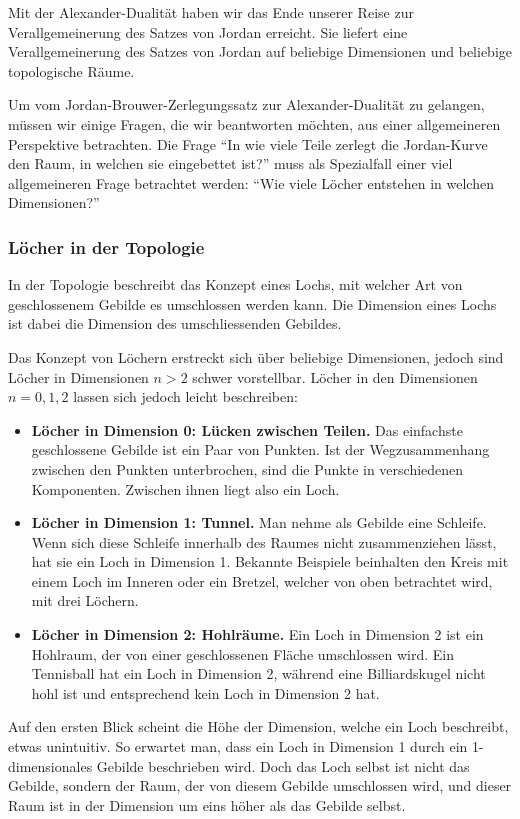 Mit der Alexander-Dualität haben wir das Ende unserer Reise zur Verallgemeinerung des Satzes von Jordan erreicht.
Sie liefert eine Verallgemeinerung des Satzes von Jordan auf beliebige Dimensionen und beliebige topologische Räume.

Um vom Jordan-Brouwer-Zerlegungssatz zur Alexander-Dualität zu gelangen, müssen wir einige Fragen, die wir beantworten möchten, aus einer allgemeineren Perspektive betrachten.
Die Frage ``In wie viele Teile zerlegt die Jordan-Kurve den Raum, in welchen sie eingebettet ist?'' muss als Spezialfall einer viel allgemeineren Frage betrachtet werden: ``Wie viele Löcher entstehen in welchen Dimensionen?''

\subsubsection{Löcher in der Topologie}

In der Topologie beschreibt das Konzept eines Lochs, mit welcher Art von geschlossenem Gebilde es umschlossen werden kann.
Die Dimension eines Lochs ist dabei die Dimension des umschliessenden Gebildes.

Das Konzept von Löchern erstreckt sich über beliebige Dimensionen, jedoch sind Löcher in Dimensionen $n>2$ schwer vorstellbar.
Löcher in den Dimensionen $n=0,1,2$ lassen sich jedoch leicht beschreiben:

\begin{itemize}
    \item \textbf{Löcher in Dimension 0: Lücken zwischen Teilen.} Das einfachste geschlossene Gebilde ist ein Paar von Punkten. Ist der Wegzusammenhang zwischen den Punkten unterbrochen, sind die Punkte in verschiedenen Komponenten. Zwischen ihnen liegt also ein Loch.
    \item \textbf{Löcher in Dimension 1: Tunnel.} Man nehme als Gebilde eine Schleife. Wenn sich diese Schleife innerhalb des Raumes nicht zusammenziehen lässt, hat sie ein Loch in Dimension 1. Bekannte Beispiele beinhalten den Kreis mit einem Loch im Inneren oder ein Bretzel, welcher von oben betrachtet wird, mit drei Löchern.
    \item \textbf{Löcher in Dimension 2: Hohlräume.} Ein Loch in Dimension 2 ist ein Hohlraum, der von einer geschlossenen Fläche umschlossen wird. Ein Tennisball hat ein Loch in Dimension 2, während eine Billiardskugel nicht hohl ist und entsprechend kein Loch in Dimension 2 hat.
\end{itemize}

Auf den ersten Blick scheint die Höhe der Dimension, welche ein Loch beschreibt, etwas unintuitiv.
So erwartet man, dass ein Loch in Dimension 1 durch ein 1-dimensionales Gebilde beschrieben wird.
Doch das Loch selbst ist nicht das Gebilde, sondern der Raum, der von diesem Gebilde umschlossen wird, und dieser Raum ist in der Dimension um eins höher als das Gebilde selbst.

